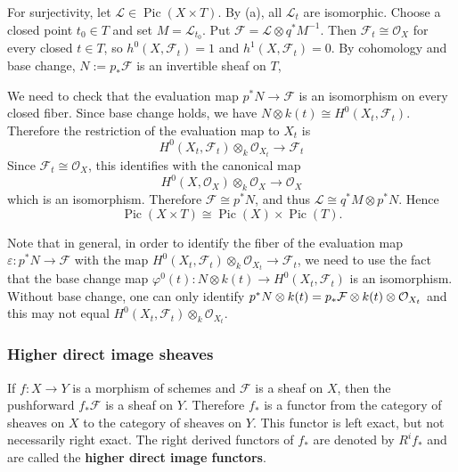 \documentclass[12pt]{article}
\begin{document}
\begin{solution}
\begin{enumerate}
              For surjectivity, let $\mathcal L\in \operatorname{Pic}(X\times T)$. By (a), all $\mathcal L_t$ are isomorphic. Choose a closed point $t_0\in T$ and set $M=\mathcal L_{t_0}$. Put $\mathcal F=\mathcal L\otimes q^*M^{-1}$. Then $\mathcal F_t\cong \mathcal O_X$ for every closed $t\in T$, so $h^0(X,\mathcal F_t)=1$ and $h^1(X,\mathcal F_t)=0$. By cohomology and base change, $N:=p_*\mathcal F$ is an invertible sheaf on $T$,

              We need to check that the evaluation map $p^*N\to \mathcal F$ is an isomorphism on every closed fiber. Since base change holds, we have $N\otimes k(t) \cong H^0(X_t,\mathcal F_t)$. Therefore the restriction of the evaluation map to $X_t$ is
              \[H^0(X_t,\mathcal F_t)\otimes_k \mathcal O_{X_t} \to \mathcal F_t\]
              Since $\mathcal F_t\cong \mathcal O_X$, this identifies with the canonical map
              \[H^0(X,\mathcal O_X)\otimes_k \mathcal O_X \to \mathcal O_X\]
              which is an isomorphism.
              Therefore $\mathcal F\cong p^*N$, and thus $\mathcal L\cong q^*M\otimes p^*N$. Hence
              \[
                  \operatorname{Pic}(X\times T)\cong \operatorname{Pic}(X)\times \operatorname{Pic}(T).
              \]
    \end{enumerate}
\end{solution}

Note that in general, in order to identify the fiber of the evaluation map $\varepsilon: p^*N\to \mathcal F$ with the map $H^0(X_t,\mathcal F_t)\otimes_k \mathcal O_{X_t} \to \mathcal F_t$, we need to use the fact that the base change map $\varphi^0(t): N\otimes k(t) \to H^0(X_t,\mathcal F_t)$ is an isomorphism. Without base change, one can only identify $p^*N\otimes k(t) = p_* \mathcal F \otimes k(t) \otimes {\mathcal{O}}_{X_t}$ and this may not equal $H^0(X_t,\mathcal F_t)\otimes_k \mathcal O_{X_t}$.

\subsubsection{Higher direct image sheaves}
If $f:X\to Y$ is a morphism of schemes and $\mathcal F$ is a sheaf on $X$, then the pushforward $f_*\mathcal F$ is a sheaf on $Y$. Therefore $f_*$ is a functor from the category of sheaves on $X$ to the category of sheaves on $Y$. This functor is left exact, but not necessarily right exact. The right derived functors of $f_*$ are denoted by $R^i f_*$ and are called the \textbf{higher direct image functors}.
\end{document}

